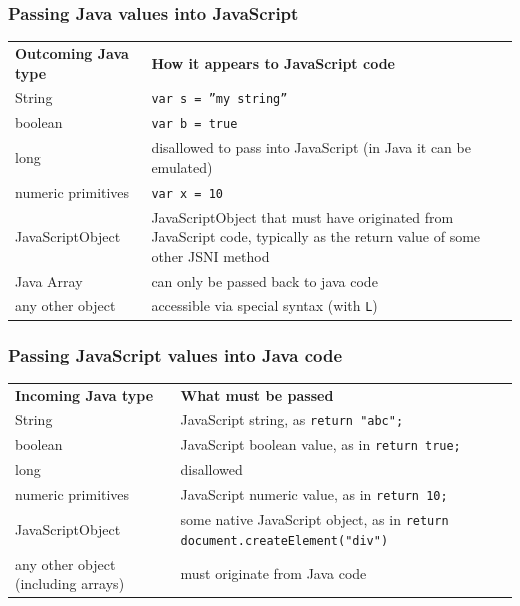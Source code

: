\documentclass[10pt,table, xcolor=pdflatex]{beamer}
\begin{document}
\begin{frame}[fragile]\frametitle{Passing Java values into JavaScript}
	\begin{footnotesize}
    	\renewcommand{\arraystretch}{1.7}
        \begin{tabular}{p{4.5cm} p{5.5cm}}
        \rowcolor{blue!20}
        \vspace{.05pt}
        \textbf{Outcoming Java type} & \vspace{.05pt} \textbf{How it appears to JavaScript code}\\[.05pt]
        \scriptsize
        
		String & \texttt{var s = \color{red}”my string”}\\
        boolean & \texttt{var b = true}\\
        long & disallowed to pass into JavaScript (in Java it can be emulated)\\
        numeric primitives & \texttt{var x = 10}\\
        JavaScriptObject & JavaScriptObject that must have originated from JavaScript code, typically as the return value of some other JSNI method\\
        Java Array & can only be passed back to java code\\
        any other object & accessible via special syntax (with \texttt{L})
        \normalsize
        \end{tabular}
        \renewcommand{\arraystretch}{1}
	\end{footnotesize}
\end{frame}

\begin{frame}[fragile]\frametitle{Passing JavaScript values into Java code}
	\begin{footnotesize}
    	\renewcommand{\arraystretch}{1.7}
        \begin{tabular}{p{5cm} p{5cm}}
        \rowcolor{blue!20}
        \vspace{.05pt}
        \textbf{Incoming Java type} & \vspace{.05pt} \textbf{What must be passed}\\[.05pt]
        \scriptsize
        String & JavaScript string, as \texttt{return \color{red}"abc"\color{black};}\\
        boolean & JavaScript boolean value, as in \texttt{return true;}\\
        long & disallowed\\
        numeric primitives & JavaScript numeric value, as in \texttt{return 10;}\\
        JavaScriptObject & some native JavaScript object, as in \texttt{return document.createElement(\color{red}"div"\color{black})}\\
        any other object (including arrays) & must originate from Java code
        \normalsize
        \end{tabular}
        \renewcommand{\arraystretch}{1}
	\end{footnotesize}
\end{frame}
\end{document}
